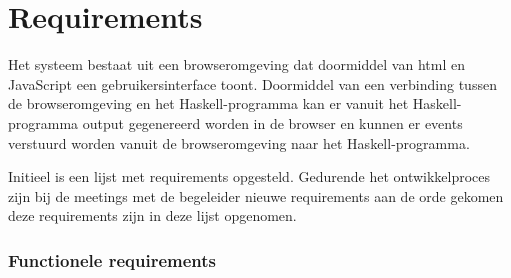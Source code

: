 \section{Requirements} \label{sec:requirements}
Het systeem bestaat uit een browseromgeving dat doormiddel van html en JavaScript een gebruikersinterface toont. Doormiddel van een verbinding tussen de browseromgeving en het Haskell-programma kan er vanuit het Haskell-programma output gegenereerd worden in de browser en kunnen er events verstuurd worden vanuit de browseromgeving naar het Haskell-programma.

Initieel is een lijst met requirements opgesteld. Gedurende het ontwikkelproces zijn bij de meetings met de begeleider nieuwe requirements aan de orde gekomen deze requirements zijn in deze lijst opgenomen.

\subsubsection{Functionele requirements}
